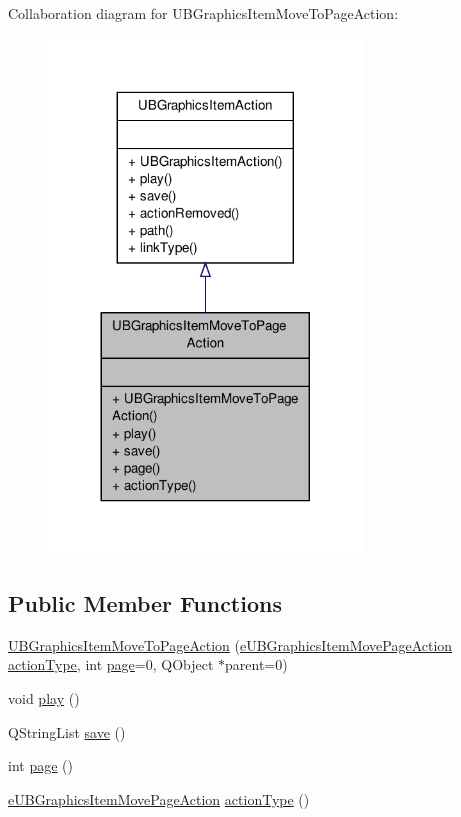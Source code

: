 Collaboration diagram for U\-B\-Graphics\-Item\-Move\-To\-Page\-Action\-:
\nopagebreak
\begin{figure}[H]
\begin{center}
\leavevmode
\includegraphics[width=236pt]{d4/dc0/class_u_b_graphics_item_move_to_page_action__coll__graph}
\end{center}
\end{figure}
\subsection*{Public Member Functions}
\begin{DoxyCompactItemize}
\item 
\hyperlink{class_u_b_graphics_item_move_to_page_action_a2ccc0fae48534e7a822d379323430e81}{U\-B\-Graphics\-Item\-Move\-To\-Page\-Action} (\hyperlink{_u_b_graphics_item_action_8h_a86f397563d9e8c205c07f75f5fc48f27}{e\-U\-B\-Graphics\-Item\-Move\-Page\-Action} \hyperlink{class_u_b_graphics_item_move_to_page_action_a68baa44673c2a4372f8b721230db1a60}{action\-Type}, int \hyperlink{class_u_b_graphics_item_move_to_page_action_a25993807f54d7b4b65c7d4066815535b}{page}=0, Q\-Object $\ast$parent=0)
\item 
void \hyperlink{class_u_b_graphics_item_move_to_page_action_abc9450ecbd727b1cf7a1476d9ec7eba6}{play} ()
\item 
Q\-String\-List \hyperlink{class_u_b_graphics_item_move_to_page_action_a0babf674937810b422fd1c6377b2ece3}{save} ()
\item 
int \hyperlink{class_u_b_graphics_item_move_to_page_action_a25993807f54d7b4b65c7d4066815535b}{page} ()
\item 
\hyperlink{_u_b_graphics_item_action_8h_a86f397563d9e8c205c07f75f5fc48f27}{e\-U\-B\-Graphics\-Item\-Move\-Page\-Action} \hyperlink{class_u_b_graphics_item_move_to_page_action_a68baa44673c2a4372f8b721230db1a60}{action\-Type} ()
\end{DoxyCompactItemize}


